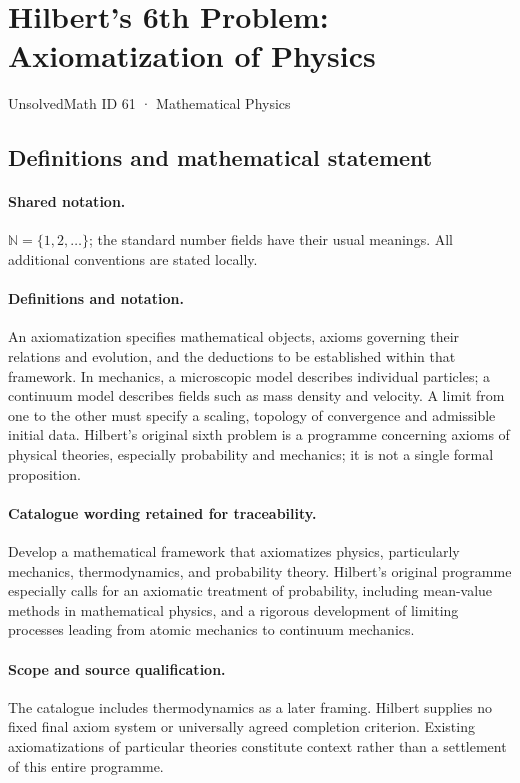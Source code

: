 \documentclass[11pt]{article}
\begin{document}
\setcounter{section}{60}
\section{Hilbert's 6th Problem: Axiomatization of Physics}\label{61}
{\small UnsolvedMath ID 61 · Mathematical Physics}
\subsection{Definitions and mathematical statement}

\paragraph{Shared notation.}$\mathbb N=\{1,2,\ldots\}$; the standard number fields have their usual meanings. All additional conventions are stated locally.


\paragraph{Definitions and notation.}An axiomatization specifies mathematical objects, axioms governing their relations and evolution, and the deductions to be established within that framework. In mechanics, a microscopic model describes individual particles; a continuum model describes fields such as mass density and velocity. A limit from one to the other must specify a scaling, topology of convergence and admissible initial data. Hilbert’s original sixth problem is a programme concerning axioms of physical theories, especially probability and mechanics; it is not a single formal proposition.

\paragraph{Catalogue wording retained for traceability.}
Develop a mathematical framework that axiomatizes physics, particularly mechanics, thermodynamics, and probability theory. Hilbert’s original programme especially calls for an axiomatic treatment of probability, including mean-value methods in mathematical physics, and a rigorous development of limiting processes leading from atomic mechanics to continuum mechanics.
\paragraph{Scope and source qualification.}The catalogue includes thermodynamics as a later framing. Hilbert supplies no fixed final axiom system or universally agreed completion criterion. Existing axiomatizations of particular theories constitute context rather than a settlement of this entire programme.
\end{document}
